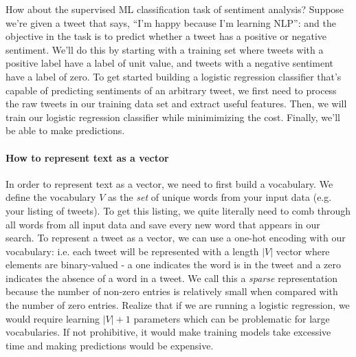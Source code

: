 \documentclass[12pt]{article}
\begin{document}
How about the supervised ML classification task of sentiment analysis? Suppose we're given a tweet that says, ``I'm happy because I'm learning NLP'': and the objective in the task is to predict whether a tweet has a positive or negative sentiment. We'll do this by starting with a training set where tweets with a positive label have a label of unit value, and tweets with a negative sentiment have a label of zero.
To get started building a logistic regression classifier that's capable of predicting sentiments of an arbitrary tweet, we first need to process the raw tweets in our training data set and extract useful features. Then, we will train our logistic regression classifier while minimimizing the cost. Finally, we'll be able to make predictions.

\paragraph{How to represent text as a vector} In order to represent text as a vector, we need to first build a vocabulary. We define the vocabulary $V$ as the \emph{set} of unique words from your input data (e.g. your listing of tweets). To get this listing, we quite literally need to comb through all words from all input data and save every new word that appears in our search.
To represent a tweet as a vector, we can use a one-hot encoding with our vocabulary: i.e. each tweet will be represented with a length $|V|$ vector where elements are binary-valued - a one indicates the word is in the tweet and a zero indicates the absence of a word in a tweet. We call this a \emph{sparse} representation because the number of non-zero entries is relatively small when compared with the number of zero entries. Realize that if we are running a logistic regression, we would require learning $|V| + 1$ parameters which can be problematic for large vocabularies. If not prohibitive, it would make training models take excessive time and making predictions would be expensive.
\end{document}

